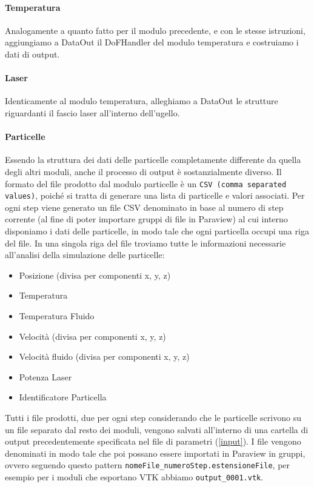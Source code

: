     \paragraph{Temperatura}
    Analogamente a quanto fatto per il modulo precedente, e con le stesse istruzioni, aggiungiamo a DataOut il DoFHandler del modulo temperatura e costruiamo i dati di output.

    \paragraph{Laser}
    Identicamente al modulo temperatura, alleghiamo a DataOut le strutture riguardanti il fascio laser all'interno dell'ugello.

    \paragraph{Particelle}
    Essendo la struttura dei dati delle particelle completamente differente da quella degli altri moduli, anche il processo di output è sostanzialmente diverso.
    Il formato del file prodotto dal modulo particelle è un \texttt{CSV (comma separated values)}, poiché si tratta di generare una lista di particelle e valori associati.
    Per ogni step viene generato un file CSV denominato in base al numero di step corrente (al fine di poter importare gruppi di file in Paraview) al cui interno disponiamo
    i dati delle particelle, in modo tale che ogni particella occupi una riga del file. In una singola riga del file troviamo tutte le informazioni necessarie all'analisi
    della simulazione delle particelle:
    \begin{itemize}
        \item Posizione (divisa per componenti x, y, z)
        \item Temperatura
        \item Temperatura Fluido
        \item Velocità (divisa per componenti x, y, z)
        \item Velocità fluido (divisa per componenti x, y, z)
        \item Potenza Laser
        \item Identificatore Particella
    \end{itemize}

    Tutti i file prodotti, due per ogni step considerando che le particelle scrivono su un file separato dal resto dei moduli, vengono salvati all'interno di una cartella
    di output precedentemente specificata nel file di parametri (\ref*{input}). I file vengono denominati in modo tale che poi possano essere importati in Paraview
    in gruppi, ovvero seguendo questo pattern \texttt{nomeFile\_numeroStep.estensioneFile}, per esempio per i moduli che esportano VTK abbiamo \texttt{output\_0001.vtk}.
